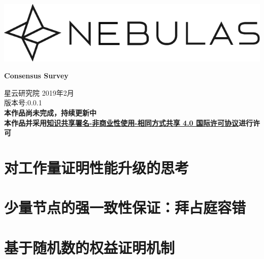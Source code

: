 \documentclass[12pt]{article}
\begin{document}
\pagestyle{empty}
\renewcommand{\contentsname}{目录}
\renewcommand{\abstractname}{摘要}
\renewcommand{\refname}{参考文献}
\renewcommand{\figurename}{图}
\renewcommand{\tablename}{表}
\renewcommand{\baselinestretch}{1.5}
\renewcommand{\appendixname}{附录}
\renewcommand{\proofname}{证明}

\pagecolor{\pcolor}

\begin{titlepage}
  \begin{center}
    \vspace*{5.5cm}
    \includegraphics[scale=0.5]{../common/Nebulas.png}
    \vspace{0.5cm}

  \textbf{\huge{Consensus Survey}}

    \vspace{0.5cm}
    星云研究院
    \vfill
    2019年2月 \\
    版本号:0.0.1\\
    \textbf{本作品尚未完成，持续更新中\\本作品并采用\href{http://creativecommons.org/licenses/by-nc-sa/4.0/}{知识共享署名-非商业性使用-相同方式共享 4.0 国际许可协议}进行许可}
  \end{center}

\end{titlepage}
\setcounter{page}{0}
\tableofcontents
\newpage
\setcounter{page}{1}
\pagestyle{fancy}                                 
\vspace*{0.01cm}


\part{对工作量证明性能升级的思考}


%
\part{少量节点的强一致性保证：拜占庭容错}



\part{基于随机数的权益证明机制}



%
%
%
%
%
%
\newpage


\newpage
%
%
\end{document}
